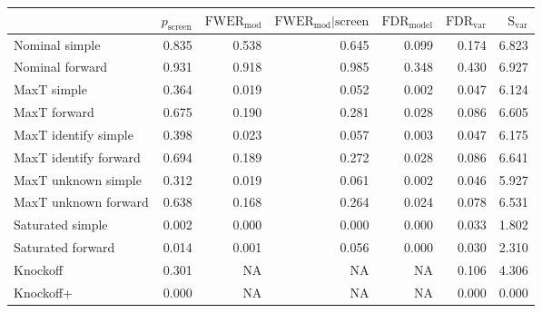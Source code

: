 
\renewcommand{\guarantee}[1]{{\color{blue} #1}}
\begin{tabular}{lrrrrrr}
\toprule
{} &  $p_{\text{screen}}$ &  $\text{FWER}_{\text{mod}}$ &  $\text{FWER}_{\text{mod}} \vert \text{screen}$ &  $\text{FDR}_{\text{model}}$ &  $\text{FDR}_{\text{var}}$ &  $\text{S}_{\text{var}}$ \\ \midrule
Nominal simple & 0.835 & 0.538 & 0.645 & 0.099 & 0.174 & 6.823 \\ 
Nominal forward & 0.931 & 0.918 & 0.985 & 0.348 & 0.430 & 6.927 \\ 
MaxT simple & 0.364 & \guarantee{0.019} & \guarantee{0.052} & \guarantee{0.002} & 0.047 & 6.124 \\ 
MaxT forward & 0.675 & 0.190 & 0.281 & \guarantee{0.028} & 0.086 & 6.605 \\ 
MaxT identify simple & 0.398 & \guarantee{0.023} & \guarantee{0.057} & \guarantee{0.003} & 0.047 & 6.175 \\ 
MaxT identify forward & 0.694 & 0.189 & 0.272 & \guarantee{0.028} & 0.086 & 6.641 \\ 
MaxT unknown simple & 0.312 & \guarantee{0.019} & \guarantee{0.061} & \guarantee{0.002} & 0.046 & 5.927 \\ 
MaxT unknown forward & 0.638 & 0.168 & 0.264 & \guarantee{0.024} & 0.078 & 6.531 \\ 
Saturated simple & 0.002 & 0.000 & 0.000 & 0.000 & 0.033 & 1.802 \\ 
Saturated forward & 0.014 & 0.001 & 0.056 & 0.000 & 0.030 & 2.310 \\ 
Knockoff & 0.301 & NA & NA & NA & 0.106 & 4.306 \\ 
Knockoff+ & 0.000 & NA & NA & NA & \guarantee{0.000} & 0.000 \\  
\bottomrule
\end{tabular}
